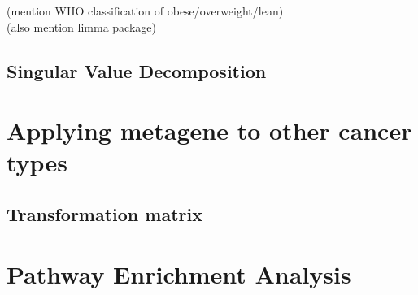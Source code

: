 (mention WHO classification of obese/overweight/lean)\\
(also mention limma package)

\subsection{Singular Value Decomposition}


\section{Applying metagene to other cancer types}

\subsection{Transformation matrix}


\section{Pathway Enrichment Analysis}








